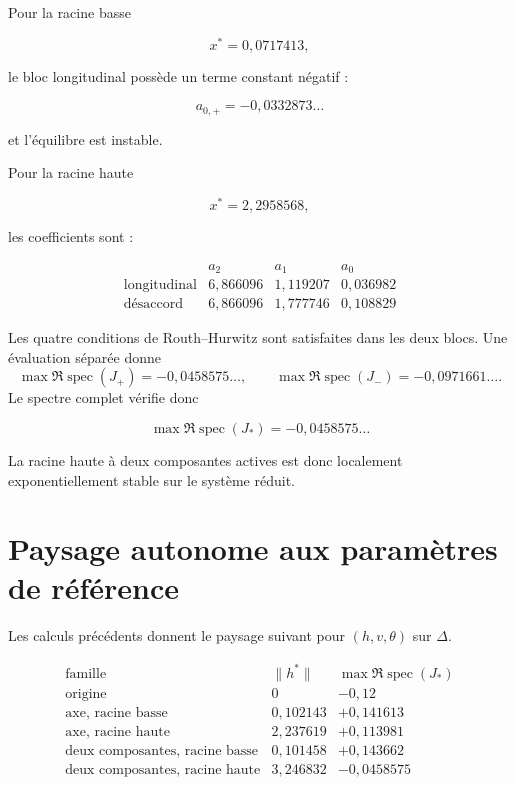 Pour la racine basse

\[
x^\ast=0{,}0717413,
\]

le bloc longitudinal possède un terme constant négatif :

\[
a_{0,+}
=
-0{,}0332873\ldots
\]

et l'équilibre est instable.

Pour la racine haute

\[
x^\ast=2{,}2958568,
\]

les coefficients sont :

\[
\begin{array}{c|ccc}
 & a_2 & a_1 & a_0\\
\hline
\text{longitudinal}
&
6{,}866096
&
1{,}119207
&
0{,}036982
\\
\text{désaccord}
&
6{,}866096
&
1{,}777746
&
0{,}108829
\end{array}
\]

Les quatre conditions de Routh--Hurwitz sont satisfaites dans les deux
blocs. Une évaluation séparée donne
\[
\max\Re\operatorname{spec}(J_+)
=
-0{,}0458575\ldots,
\qquad
\max\Re\operatorname{spec}(J_-)
=
-0{,}0971661\ldots.
\]
Le spectre complet vérifie donc

\[
\boxed{
\max\Re\operatorname{spec}(J_\ast)
=
-0{,}0458575\ldots
}
\]

La racine haute à deux composantes actives est donc localement
exponentiellement stable sur le système réduit.

\section{Paysage autonome aux paramètres de référence}
\label{annexe-reduction-paysage-reference}

Les calculs précédents donnent le paysage suivant pour
\((h,v,\theta)\) sur \(\Delta\).

\[
\begin{array}{l|c|c}
\text{famille} & \|h^\ast\| & \max\Re\operatorname{spec}(J_\ast)\\
\hline
\text{origine}
&
0
&
-0{,}12
\\
\text{axe, racine basse}
&
0{,}102143
&
+0{,}141613
\\
\text{axe, racine haute}
&
2{,}237619
&
+0{,}113981
\\
\text{deux composantes, racine basse}
&
0{,}101458
&
+0{,}143662
\\
\text{deux composantes, racine haute}
&
3{,}246832
&
-0{,}0458575
\end{array}
\]

